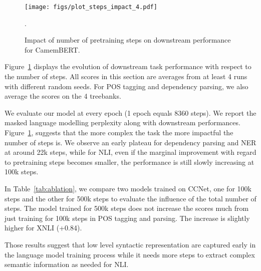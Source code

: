 \documentclass[11pt,a4paper]{article}
\newcommand{\camembert}{CamemBERT\xspace}
\newcommand{\ccnet}{CCNet\xspace}
\begin{document}
\begin{figure}[t]
\centering
\texttt{[image: figs/plot\_steps\_impact\_4.pdf]}
\caption{Impact of number of pretraining steps on downstream performance for \camembert.}. 
\label{fig:n_steps_impact}
\end{figure}


Figure~\ref{fig:n_steps_impact} displays the evolution of downstream task performance with respect to the number of steps. All scores in this section are averages from at least 4 runs with different random seeds. For POS tagging and dependency parsing, we also average the scores on the 4 treebanks.

We evaluate our model at every epoch (1 epoch equals 8360 steps). We report the masked language modelling perplexity along with downstream performances.
Figure~\ref{fig:n_steps_impact}, suggests that the more complex the task the more impactful the number of steps is. We observe an early plateau for dependency parsing and NER at around 22k steps, while for NLI, even if the marginal improvement with regard to pretraining steps becomes smaller, the performance is still slowly increasing at 100k steps.

In Table~\ref{tab:ablation}, we compare two models trained on \ccnet, one for 100k steps and the other for 500k steps to evaluate the influence of the total number of steps.
The model trained for 500k steps does not increase the scores much from just training for 100k steps in POS tagging and parsing.
The increase is slightly higher for XNLI (+0.84).


Those results suggest that low level syntactic representation are captured early in the language model training process while it needs more steps to extract complex semantic information as needed for NLI.
\end{document}
